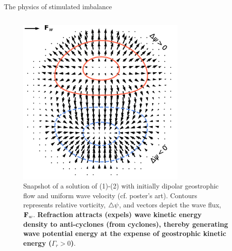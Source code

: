 \documentclass[final]{beamer}
\begin{document}
\begin{frame}[t]
\begin{columns}[t]
\begin{column}{0.425\paperwidth}
{\begin{alertblock}{The physics of stimulated imbalance}
                \begin{columns}
                  \begin{column}{.425\textwidth}
                  \begin{figure}
                    \includegraphics[width=0.75\textwidth]{figs/Gamma_r.pdf}
                    \caption{Snapshot of a solution of (1)-(2) with initially dipolar
                              geostrophic flow and uniform wave velocity
                              (cf. poster's art). Contours represents relative vorticity, $\triangle\psi$,
                              and vectors depict the wave flux, $\mathbf{F}_w$.
                              \textbf{Refraction attracts (expels)
                              wave kinetic energy density to anti-cyclones (from cyclones),
                              thereby generating wave potential energy at the expense
                              of geostrophic kinetic energy ($\Gamma_r>0$)}.
                              }
                  \end{figure}
                \end{column}


\end{columns}
\end{alertblock}}
\end{column}
\end{columns}
\end{frame}
\end{document}

